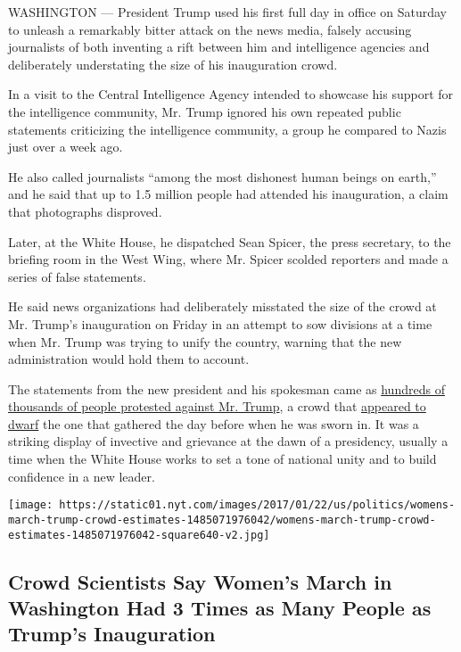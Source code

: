 WASHINGTON --- President Trump used his first full day in office on
Saturday to unleash a remarkably bitter attack on the news media,
falsely accusing journalists of both inventing a rift between him and
intelligence agencies and deliberately understating the size of his
inauguration crowd.

In a visit to the Central Intelligence Agency intended to showcase his
support for the intelligence community, Mr. Trump ignored his own
repeated public statements criticizing the intelligence community, a
group he compared to Nazis just over a week ago.

He also called journalists ``among the most dishonest human beings on
earth,'' and he said that up to 1.5 million people had attended his
inauguration, a claim that photographs disproved.

Later, at the White House, he dispatched Sean Spicer, the press
secretary, to the briefing room in the West Wing, where Mr. Spicer
scolded reporters and made a series of false statements.

He said news organizations had deliberately misstated the size of the
crowd at Mr. Trump's inauguration on Friday in an attempt to sow
divisions at a time when Mr. Trump was trying to unify the country,
warning that the new administration would hold them to account.

The statements from the new president and his spokesman came as
\href{https://www.nytimes.com/2017/01/21/us/women-march-protest-president-trump.html}{hundreds
of thousands of people protested against Mr. Trump}, a crowd that
\href{https://www.nytimes.com/interactive/2017/01/22/us/politics/womens-march-trump-crowd-estimates.html}{appeared
to dwarf} the one that gathered the day before when he was sworn in. It
was a striking display of invective and grievance at the dawn of a
presidency, usually a time when the White House works to set a tone of
national unity and to build confidence in a new leader.

\href{https://www.nytimes.com/interactive/2017/01/22/us/politics/womens-march-trump-crowd-estimates.html}{}

\texttt{[image: https://static01.nyt.com/images/2017/01/22/us/politics/womens-march-trump-crowd-estimates-1485071976042/womens-march-trump-crowd-estimates-1485071976042-square640-v2.jpg]}

\hypertarget{crowd-scientists-say-womens-march-in-washington-had-3-times-as-many-people-as-trumps-inauguration}{%
\subsection{Crowd Scientists Say Women's March in Washington Had 3 Times
as Many People as Trump's
Inauguration}\label{crowd-scientists-say-womens-march-in-washington-had-3-times-as-many-people-as-trumps-inauguration}}

